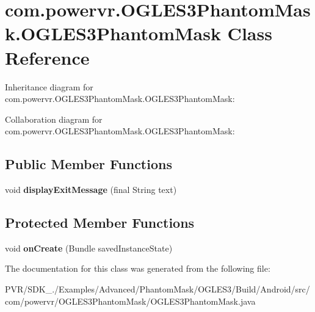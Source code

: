 \hypertarget{classcom_1_1powervr_1_1_o_g_l_e_s3_phantom_mask_1_1_o_g_l_e_s3_phantom_mask}{\section{com.\+powervr.\+O\+G\+L\+E\+S3\+Phantom\+Mask.\+O\+G\+L\+E\+S3\+Phantom\+Mask Class Reference}
\label{classcom_1_1powervr_1_1_o_g_l_e_s3_phantom_mask_1_1_o_g_l_e_s3_phantom_mask}
}


Inheritance diagram for com.\+powervr.\+O\+G\+L\+E\+S3\+Phantom\+Mask.\+O\+G\+L\+E\+S3\+Phantom\+Mask\+:


Collaboration diagram for com.\+powervr.\+O\+G\+L\+E\+S3\+Phantom\+Mask.\+O\+G\+L\+E\+S3\+Phantom\+Mask\+:
\subsection*{Public Member Functions}
\begin{DoxyCompactItemize}
\item 
\hypertarget{classcom_1_1powervr_1_1_o_g_l_e_s3_phantom_mask_1_1_o_g_l_e_s3_phantom_mask_a2d1d8b8fc058c8b31f8102ba124fc21f}{void {\bfseries display\+Exit\+Message} (final String text)}\label{classcom_1_1powervr_1_1_o_g_l_e_s3_phantom_mask_1_1_o_g_l_e_s3_phantom_mask_a2d1d8b8fc058c8b31f8102ba124fc21f}

\end{DoxyCompactItemize}
\subsection*{Protected Member Functions}
\begin{DoxyCompactItemize}
\item 
\hypertarget{classcom_1_1powervr_1_1_o_g_l_e_s3_phantom_mask_1_1_o_g_l_e_s3_phantom_mask_a95d3222fc5d971517e0719b3e313a094}{void {\bfseries on\+Create} (Bundle saved\+Instance\+State)}\label{classcom_1_1powervr_1_1_o_g_l_e_s3_phantom_mask_1_1_o_g_l_e_s3_phantom_mask_a95d3222fc5d971517e0719b3e313a094}

\end{DoxyCompactItemize}


The documentation for this class was generated from the following file\+:\begin{DoxyCompactItemize}
\item 
P\+V\+R/\+S\+D\+K\+\_./\+Examples/\+Advanced/\+Phantom\+Mask/\+O\+G\+L\+E\+S3/\+Build/\+Android/src/com/powervr/\+O\+G\+L\+E\+S3\+Phantom\+Mask/O\+G\+L\+E\+S3\+Phantom\+Mask.\+java\end{DoxyCompactItemize}
